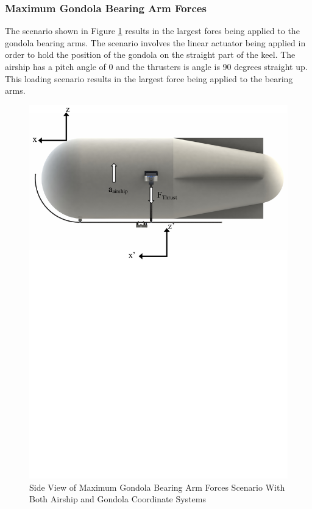 \documentclass[../main.tex]{subfiles}
\begin{document}
\subsubsection*{Maximum Gondola Bearing Arm Forces}
The scenario shown in Figure \ref{fig:scenario2} results in the largest fores being applied to the gondola bearing arms. The scenario involves the linear actuator being applied in order to hold the position of the gondola on the straight part of the keel. The airship has a pitch angle of 0 and the thrusters is  angle is 90 degrees straight up. This loading scenario results in the largest force  being applied to the bearing arms.
\begin{figure}[H]
	\centering
	\includegraphics[width=1\textwidth]{img/analysis/scenario2.pdf}
	\caption{Side View of Maximum Gondola Bearing Arm Forces Scenario With Both Airship and Gondola Coordinate Systems}
	\label{fig:scenario2}
\end{figure}
\end{document}
